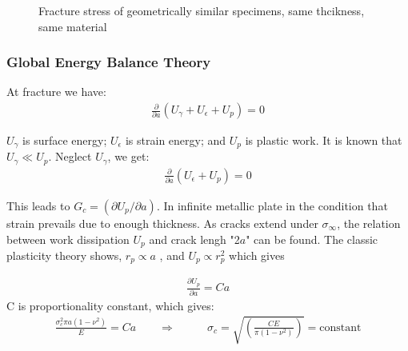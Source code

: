 \documentclass[12pt]{article}
\begin{document}
\begin{figure}[H]
    \centering
    \captionsetup{labelformat=empty}
    \caption{Fracture stress of geometrically similar specimens, same thcikness, same material}
\end{figure}

\subsubsection{Global Energy Balance Theory}
At fracture we have:
\begin{align*}
    \frac{\partial}{\partial a}(U_\gamma + U_\epsilon + U_p) = 0 \tag{6} \label{6}
\end{align*}

$U_\gamma$ is surface energy; $U_\epsilon$ is strain energy; and $U_p$ is plastic work. 
It is known that $U_\gamma \ll U_p$. Neglect $U_\gamma$, we get: 
\begin{align*}
    \frac{\partial}{\partial a}(U_\epsilon + U_p) = 0 \tag{7} \label{7}
\end{align*}

This leads to $G_c = (\partial U_p/\partial a)$. In infinite metallic
plate in the condition that strain prevails due to enough thickness. As
cracks extend under $\sigma_\infty$, the relation between work dissipation $U_p$
and crack lengh "2$a$" can be found. The classic plasticity theory shows, $r_p \propto a$ ,
and $U_p \propto r_{p} ^{2}$ which gives

\begin{align*}
    \frac{\partial U_p}{\partial a} = Ca
\end{align*}
C is proportionality constant, which gives:
\begin{align}
    \frac{\sigma_{c}^{2} \pi a (1 - \nu ^ 2)}{E} = Ca \qquad
\Rightarrow \qquad &\sigma_c = \sqrt{(\frac{CE}{\pi (1 - \nu ^ 2)})} = \text{constant} \nonumber
\end{align}
\end{document}
